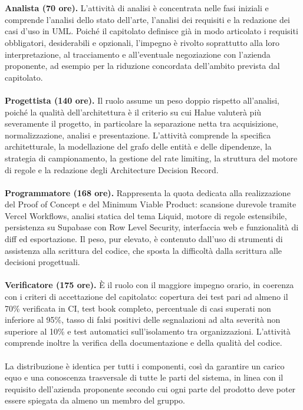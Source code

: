 \\ \\
\textbf{Analista (70 ore).} L'attività di analisi è concentrata nelle fasi iniziali e comprende l'analisi dello stato dell'arte, l'analisi dei requisiti e la redazione dei casi d'uso in UML. Poiché il capitolato definisce già in modo articolato i requisiti obbligatori, desiderabili e opzionali, l'impegno è rivolto soprattutto alla loro interpretazione, al tracciamento e all'eventuale negoziazione con l'azienda proponente, ad esempio per la riduzione concordata dell'ambito prevista dal capitolato.
\\ \\
\textbf{Progettista (140 ore).} Il ruolo assume un peso doppio rispetto all'analisi, poiché la qualità dell'architettura è il criterio su cui Halue valuterà più severamente il progetto, in particolare la separazione netta tra acquisizione, normalizzazione, analisi e presentazione. L'attività comprende la specifica architetturale, la modellazione del grafo delle entità e delle dipendenze, la strategia di campionamento, la gestione del rate limiting, la struttura del motore di regole e la redazione degli Architecture Decision Record.
\\ \\
\textbf{Programmatore (168 ore).} Rappresenta la quota dedicata alla realizzazione del Proof of Concept e del Minimum Viable Product: scansione durevole tramite Vercel Workflows, analisi statica del tema Liquid, motore di regole estensibile, persistenza su Supabase con Row Level Security, interfaccia web e funzionalità di diff ed esportazione. Il peso, pur elevato, è contenuto dall'uso di strumenti di assistenza alla scrittura del codice, che sposta la difficoltà dalla scrittura alle decisioni progettuali.
\\ \\
\textbf{Verificatore (175 ore).} È il ruolo con il maggiore impegno orario, in coerenza con i criteri di accettazione del capitolato: copertura dei test pari ad almeno il 70\% verificata in CI, test book completo, percentuale di casi superati non inferiore al 95\%, tasso di falsi positivi delle segnalazioni ad alta severità non superiore al 10\% e test automatici sull'isolamento tra organizzazioni. L'attività comprende inoltre la verifica della documentazione e della qualità del codice.
\\ \\
La distribuzione è identica per tutti i componenti, così da garantire un carico equo e una conoscenza trasversale di tutte le parti del sistema, in linea con il requisito dell'azienda proponente secondo cui ogni parte del prodotto deve poter essere spiegata da almeno un membro del gruppo.

